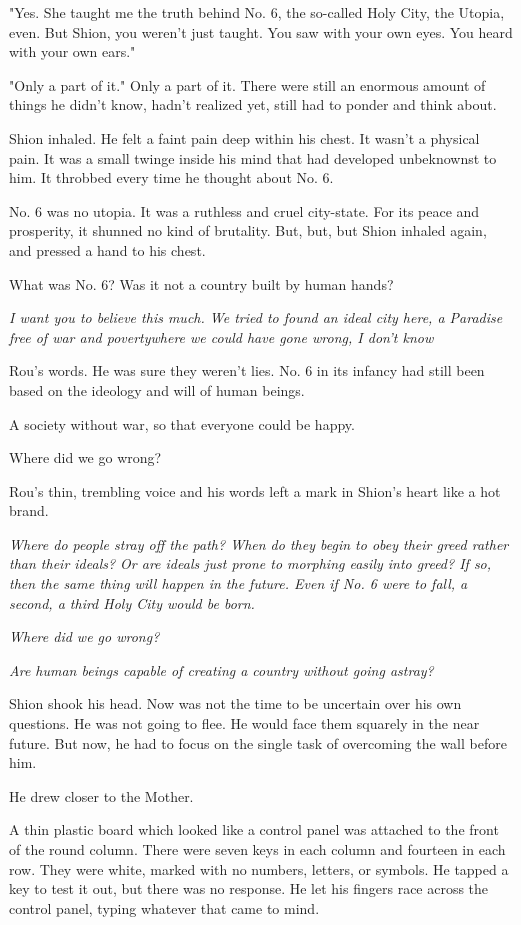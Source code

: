 "Yes. She taught me the truth behind No. 6, the so-called Holy City, the
Utopia, even. \el But Shion, you weren't just taught. You saw with your
own eyes. You heard with your own ears."

"Only a part of it." Only a part of it. There were still an enormous
amount of things he didn't know, hadn't realized yet, still had to
ponder and think about.

Shion inhaled. He felt a faint pain deep within his chest. It wasn't a
physical pain. It was a small twinge inside his mind that had developed
unbeknownst to him. It throbbed every time he thought about No. 6.

No. 6 was no utopia. It was a ruthless and cruel city-state. For its
peace and prosperity, it shunned no kind of brutality. But, but, but\el 
Shion inhaled again, and pressed a hand to his chest.

What was No. 6? Was it not a country built by human hands?

\emph{I want you to believe this much. We tried to found an ideal city here, a
Paradise free of war and poverty\el where we could have gone wrong, I
don't know\el }

Rou's words. He was sure they weren't lies. No. 6 in its infancy had
still been based on the ideology and will of human beings.

A society without war, so that everyone could be happy.

Where did we go wrong?

Rou's thin, trembling voice and his words left a mark in Shion's heart
like a hot brand.

\emph{Where do people stray off the path? When do they begin to obey their
greed rather than their ideals? Or are ideals just prone to morphing
easily into greed? If so, then the same thing will happen in the future.
Even if No. 6 were to fall, a second, a third Holy City would be born.}

\emph{Where did we go wrong?}

\emph{Are human beings capable of creating a country without going astray?}

Shion shook his head. Now was not the time to be uncertain over his own
questions. He was not going to flee. He would face them squarely in the
near future. But now, he had to focus on the single task of overcoming
the wall before him.

He drew closer to the Mother.

A thin plastic board which looked like a control panel was attached to
the front of the round column. There were seven keys in each column and
fourteen in each row. They were white, marked with no numbers, letters,
or symbols. He tapped a key to test it out, but there was no response.
He let his fingers race across the control panel, typing whatever that
came to mind.

